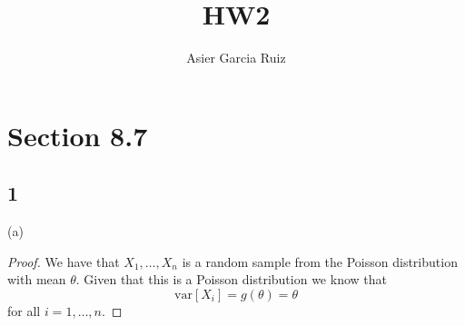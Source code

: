 \documentclass{article}
\title{HW2}
\author{Asier Garcia Ruiz}
\newcommand{\var}[1]{\text{var}\left[#1\right]}
\newcommand{\randsamp}{X_1,\dots,X_n}
\begin{document}
\maketitle

\section*{Section 8.7}
\subsection*{1}
(a)
\begin{proof}
    We have that $\randsamp$ is a random sample from the Poisson distribution
    with mean $\theta$. Given that this is a Poisson distribution we know that
    \begin{equation*}
        \var{X_i} = g(\theta) = \theta %
    \end{equation*}
    for all $i = 1,\dots,n$.
\end{proof}
\end{document}
